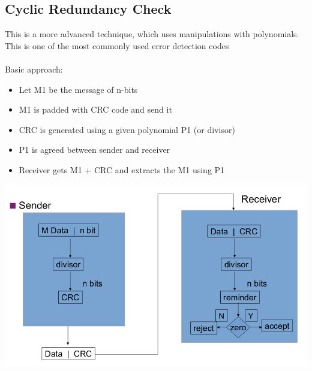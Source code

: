 \documentclass{article}[18pt]
\begin{document}
\subsection{Cyclic Redundancy Check}
This is a more advanced technique, which uses manipulations with polynomials. This is one of the most commonly used error detection codes\\
\\
Basic approach:
\begin{itemize}
	\item Let M1 be the message of n-bits
	\item M1 is padded with CRC code and send it
	\item CRC is generated using a given polynomial P1 (or divisor)
	\item P1 is agreed between sender and receiver
	\item Receiver gets M1 + CRC and extracts the M1 using P1
\end{itemize}
\begin{center}
	\includegraphics[scale=0.7]{CRC}
\end{center}
\end{document}
